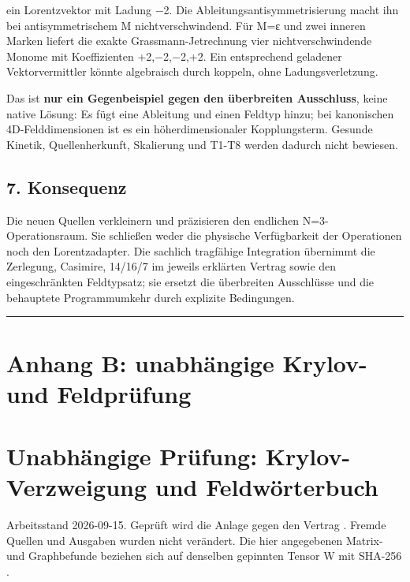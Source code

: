 ein Lorentzvektor mit Ladung −2. Die Ableitungsantisymmetrisierung macht
ihn bei antisymmetrischem M nichtverschwindend. Für M=ε und zwei inneren
Marken liefert die exakte Grassmann-Jetrechnung vier nichtverschwindende
Monome mit Koeffizienten +2,−2,−2,+2. Ein entsprechend geladener
Vektorvermittler könnte algebraisch durch
 koppeln, ohne
Ladungsverletzung.

Das ist \textbf{nur ein Gegenbeispiel gegen den überbreiten Ausschluss},
keine native Lösung: Es fügt eine Ableitung und einen Feldtyp hinzu; bei
kanonischen 4D-Felddimensionen ist es ein höherdimensionaler
Kopplungsterm. Gesunde Kinetik, Quellenherkunft, Skalierung und T1-T8
werden dadurch nicht bewiesen.

\subsection{7. Konsequenz}\label{konsequenz}

Die neuen Quellen verkleinern und präzisieren den endlichen
N=3-Operationsraum. Sie schließen weder die physische Verfügbarkeit der
Operationen noch den Lorentzadapter. Die sachlich tragfähige Integration
übernimmt die Zerlegung, Casimire, 14/16/7 im jeweils erklärten Vertrag
sowie den eingeschränkten Feldtypsatz; sie ersetzt die überbreiten
Ausschlüsse und die behauptete Programmumkehr durch explizite
Bedingungen.

\begin{center}\rule{0.5\linewidth}{0.5pt}\end{center}

\section{Anhang B: unabhängige Krylov- und
Feldprüfung}\label{anhang-b-unabhuxe4ngige-krylov--und-feldpruxfcfung}

\section{Unabhängige Prüfung: Krylov-Verzweigung und
Feldwörterbuch}\label{unabhuxe4ngige-pruxfcfung-krylov-verzweigung-und-feldwuxf6rterbuch}

Arbeitsstand 2026-09-15. Geprüft wird die Anlage
 gegen den Vertrag
.
Fremde Quellen und Ausgaben wurden nicht verändert. Die hier angegebenen
Matrix- und Graphbefunde beziehen sich auf denselben gepinnten Tensor W
mit SHA-256
.


